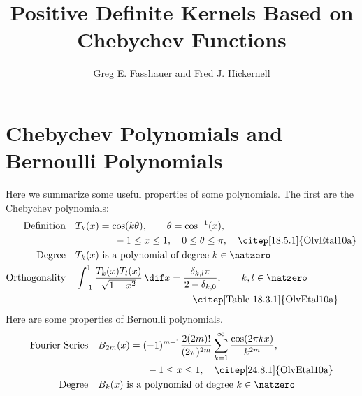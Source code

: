 \documentclass[]{elsarticle}
\theoremstyle{definition}
\begin{document}
\begin{frontmatter}

\title{Positive Definite Kernels Based on Chebychev Functions}
\author{Greg E. Fasshauer and Fred J. Hickernell}
\address{Room E1-208, Department of Applied Mathematics, Illinois Institute of Technology,\\ 10 W.\ 32$^{\text{nd}}$ St., Chicago, IL 60616}
\begin{abstract} 
\end{abstract}

\begin{keyword}


\end{keyword}
\end{frontmatter}

\section{Chebychev Polynomials and Bernoulli Polynomials}
Here we summarize some useful properties of some polynomials.  The first are the Chebychev polynomials:
\begin{align}
\text{Definition} \quad & T_k(x) = \cos(k \theta), \qquad \theta=\cos^{-1}(x),\nonumber \\
& \qquad \qquad -1 \le x \le 1, \quad 0 \le \theta \le \pi, \quad \text{\citep[18.5.1]{OlvEtal10a}} \\
\text{Degree} \quad &T_k(x) \text{ is a polynomial of degree } k \in \natzero  \nonumber \\
\text{Orthogonality} \quad & \int_{-1}^{1} \frac{T_k(x)T_{l}(x)}{\sqrt{1-x^2}} \, \dif x = \frac{\delta_{k,l}\pi}{2-\delta_{k,0}} ,  \qquad k,l \in \natzero \nonumber \\ 
& \qquad \qquad \qquad \qquad \qquad \qquad  \text{\citep[Table 18.3.1]{OlvEtal10a}} 
\end{align}
Here are some properties of Bernoulli polynomials.
\begin{align}
\text{Fourier Series} \quad & B_{2m}(x) = (-1)^{m+1} \frac{2 (2m)!} {(2 \pi)^{2m}} \sum_{k=1}^{\infty} \frac{\cos(2 \pi k x)}{k^{2m}}, \nonumber \\
& \qquad \qquad  \quad -1 \le x \le 1, \quad \text{\citep[24.8.1]{OlvEtal10a}} \\
\text{Degree} \quad &B_k(x) \text{ is a polynomial of degree } k \in \natzero  \nonumber \end{align}
\end{document}
